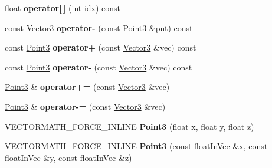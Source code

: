 \begin{DoxyCompactItemize}
float {\bfseries operator\mbox{[}$\,$\mbox{]}} (int idx) const
\item 
\mbox{\label{classVectormath_1_1Aos_1_1Point3_a4e433d5db0dab90d2e941a6981f97730}} 
const \hyperlink{classVectormath_1_1Aos_1_1Vector3}{Vector3} {\bfseries operator-\/} (const \hyperlink{classVectormath_1_1Aos_1_1Point3}{Point3} \&pnt) const
\item 
\mbox{\label{classVectormath_1_1Aos_1_1Point3_a23ae6fabbd3330bf220915f8184ffd35}} 
const \hyperlink{classVectormath_1_1Aos_1_1Point3}{Point3} {\bfseries operator+} (const \hyperlink{classVectormath_1_1Aos_1_1Vector3}{Vector3} \&vec) const
\item 
\mbox{\label{classVectormath_1_1Aos_1_1Point3_ace39ea5ea8e3ef62bed449a31e679ffb}} 
const \hyperlink{classVectormath_1_1Aos_1_1Point3}{Point3} {\bfseries operator-\/} (const \hyperlink{classVectormath_1_1Aos_1_1Vector3}{Vector3} \&vec) const
\item 
\mbox{\label{classVectormath_1_1Aos_1_1Point3_a4f7f61200e8ced36d7fb661af52d8222}} 
\hyperlink{classVectormath_1_1Aos_1_1Point3}{Point3} \& {\bfseries operator+=} (const \hyperlink{classVectormath_1_1Aos_1_1Vector3}{Vector3} \&vec)
\item 
\mbox{\label{classVectormath_1_1Aos_1_1Point3_a804c9086101d647919f3600d9a61d4d4}} 
\hyperlink{classVectormath_1_1Aos_1_1Point3}{Point3} \& {\bfseries operator-\/=} (const \hyperlink{classVectormath_1_1Aos_1_1Vector3}{Vector3} \&vec)
\item 
\mbox{\label{classVectormath_1_1Aos_1_1Point3_a52cee9c70e6d12d50c89d1206d06ceb0}} 
V\+E\+C\+T\+O\+R\+M\+A\+T\+H\+\_\+\+F\+O\+R\+C\+E\+\_\+\+I\+N\+L\+I\+NE {\bfseries Point3} (float x, float y, float z)
\item 
\mbox{\label{classVectormath_1_1Aos_1_1Point3_a99f3395e4fe247d658ad402020b445e9}} 
V\+E\+C\+T\+O\+R\+M\+A\+T\+H\+\_\+\+F\+O\+R\+C\+E\+\_\+\+I\+N\+L\+I\+NE {\bfseries Point3} (const \hyperlink{classVectormath_1_1floatInVec}{float\+In\+Vec} \&x, const \hyperlink{classVectormath_1_1floatInVec}{float\+In\+Vec} \&y, const \hyperlink{classVectormath_1_1floatInVec}{float\+In\+Vec} \&z)

\end{DoxyCompactItemize}

